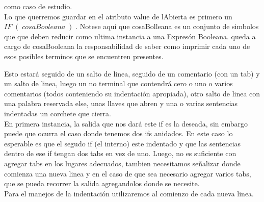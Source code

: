 como caso de estudio.
\\
Lo que querremos guardar en el atributo value de lAbierta es primero un $IF\; (\; cosaBooleana\; )\;$. Notese aquí que cosaBolleana es un conjunto de simbolos que que deben reducir como ultima instancia a una Expresón Booleana. queda a cargo de cosaBooleana la responsabilidad de saber como imprimir cada uno de esos posibles terminos que se encuentren presentes.

Esto estará seguido de un salto de linea, seguido de un comentario (con un tab) y un salto de linea, luego un no terminal que contendrá cero o uno o varios comentarios (todos conteniendo su indentación apropiada), otro salto de linea con una palabra reservada else, unas llaves que abren y una o varias sentencias indentadas un corchete que cierra.
\\
En primera instancia, la salida que nos dará este if es la deseada, sin embargo puede que ocurra el caso donde tenemos dos ifs anidados. En este caso lo esperable es que el segudo if (el interno) este indentado y que las sentencias dentro de ese if tengan dos tabs en vez de uno. Luego, no es suficiente con agregar tabs en los lugares adecuados, tambien necesitamos señalizar donde comienza una nueva linea y en el caso de que sea necesario agregar varios tabs, que se pueda recorrer la salida agregandolos donde se necesite.
\\
Para el manejos de la indentación utilizaremos al comienzo de cada nueva linea.


